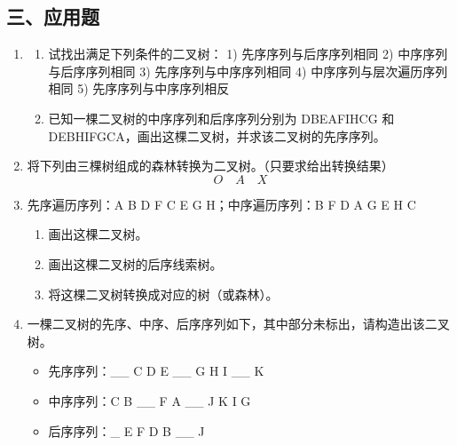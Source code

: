 \documentclass[12pt, a4paper]{article}
\begin{document}
\subsection*{三、应用题}
\begin{enumerate}
    \item 
    \begin{enumerate}
        \item[①] 试找出满足下列条件的二叉树：
        1) 先序序列与后序序列相同
        2) 中序序列与后序序列相同
        3) 先序序列与中序序列相同
        4) 中序序列与层次遍历序列相同
        5) 先序序列与中序序列相反
        \item[②] 已知一棵二叉树的中序序列和后序序列分别为 DBEAFIHCG 和 DEBHIFGCA，画出这棵二叉树，并求该二叉树的先序序列。
    \end{enumerate}
    
    \item 将下列由三棵树组成的森林转换为二叉树。（只要求给出转换结果）
    \[ O \quad A \quad X \]
    
    \item 先序遍历序列：A B D F C E G H；中序遍历序列：B F D A G E H C
    \begin{enumerate}
        \item 画出这棵二叉树。
        \item 画出这棵二叉树的后序线索树。
        \item 将这棵二叉树转换成对应的树（或森林）。
    \end{enumerate}
    
    \item 一棵二叉树的先序、中序、后序序列如下，其中部分未标出，请构造出该二叉树。
    \begin{itemize}
        \item 先序序列：\_\_ C D E \_\_ G H I \_\_ K
        \item 中序序列：C B \_\_ F A \_\_ J K I G
        \item 后序序列：\_ E F D B \_\_ J
    \end{itemize}
    

\end{enumerate}
\end{document}
